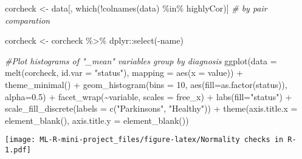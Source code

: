 \documentclass[
]{article}
\newenvironment{Shaded}{\begin{snugshade}}{\end{snugshade}}
\newcommand{\AttributeTok}[1]{\textcolor[rgb]{0.77,0.63,0.00}{#1}}
\newcommand{\CommentTok}[1]{\textcolor[rgb]{0.56,0.35,0.01}{\textit{#1}}}
\newcommand{\DecValTok}[1]{\textcolor[rgb]{0.00,0.00,0.81}{#1}}
\newcommand{\FloatTok}[1]{\textcolor[rgb]{0.00,0.00,0.81}{#1}}
\newcommand{\FunctionTok}[1]{\textcolor[rgb]{0.00,0.00,0.00}{#1}}
\newcommand{\NormalTok}[1]{#1}
\newcommand{\OtherTok}[1]{\textcolor[rgb]{0.56,0.35,0.01}{#1}}
\newcommand{\SpecialCharTok}[1]{\textcolor[rgb]{0.00,0.00,0.00}{#1}}
\newcommand{\StringTok}[1]{\textcolor[rgb]{0.31,0.60,0.02}{#1}}
\begin{document}
\begin{Shaded}
\begin{Highlighting}[]
\NormalTok{corcheck }\OtherTok{\textless{}{-}}\NormalTok{ data[, }\FunctionTok{which}\NormalTok{(}\SpecialCharTok{!}\FunctionTok{colnames}\NormalTok{(data) }\SpecialCharTok{\%in\%}\NormalTok{ highlyCor)] }\CommentTok{\# by pair comparation}

\NormalTok{corcheck }\OtherTok{\textless{}{-}}\NormalTok{ corcheck }\SpecialCharTok{\%\textgreater{}\%}\NormalTok{ dplyr}\SpecialCharTok{::}\FunctionTok{select}\NormalTok{(}\SpecialCharTok{{-}}\NormalTok{name)}
\end{Highlighting}
\end{Shaded}

\begin{Shaded}
\begin{Highlighting}[]
\CommentTok{\#Plot histograms of "\_mean" variables group by diagnosis}
\FunctionTok{ggplot}\NormalTok{(}\AttributeTok{data =} \FunctionTok{melt}\NormalTok{(corcheck, }\AttributeTok{id.var =} \StringTok{"status"}\NormalTok{), }\AttributeTok{mapping =} \FunctionTok{aes}\NormalTok{(}\AttributeTok{x =}\NormalTok{ value)) }\SpecialCharTok{+} \FunctionTok{theme\_minimal}\NormalTok{() }\SpecialCharTok{+} 
    \FunctionTok{geom\_histogram}\NormalTok{(}\AttributeTok{bins =} \DecValTok{10}\NormalTok{, }\FunctionTok{aes}\NormalTok{(}\AttributeTok{fill=}\FunctionTok{as.factor}\NormalTok{(status)), }\AttributeTok{alpha=}\FloatTok{0.5}\NormalTok{) }\SpecialCharTok{+} \FunctionTok{facet\_wrap}\NormalTok{(}\SpecialCharTok{\textasciitilde{}}\NormalTok{variable, }\AttributeTok{scales =}      \StringTok{\textquotesingle{}free\_x\textquotesingle{}}\NormalTok{) }\SpecialCharTok{+} \FunctionTok{labs}\NormalTok{(}\AttributeTok{fill=}\StringTok{"status"}\NormalTok{) }\SpecialCharTok{+} 
  \FunctionTok{scale\_fill\_discrete}\NormalTok{(}\AttributeTok{labels =} \FunctionTok{c}\NormalTok{(}\StringTok{"Parkinson\textquotesingle{}s"}\NormalTok{, }\StringTok{"Healthy"}\NormalTok{)) }\SpecialCharTok{+} \FunctionTok{theme}\NormalTok{(}\AttributeTok{axis.title.x =} \FunctionTok{element\_blank}\NormalTok{(), }\AttributeTok{axis.title.y =} \FunctionTok{element\_blank}\NormalTok{())}
\end{Highlighting}
\end{Shaded}

\texttt{[image: ML-R-mini-project\_files/figure-latex/Normality checks in R-1.pdf]}
\end{document}
